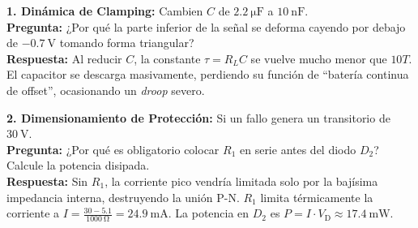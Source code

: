 \documentclass[11pt, a4paper]{article}
\begin{document}
\begin{aviso}
\textbf{1. Dinámica de Clamping:} Cambien $C$ de $\qty{2.2}{\micro\farad}$ a $\qty{10}{\nano\farad}$.\\
\textbf{Pregunta:} ¿Por qué la parte inferior de la señal se deforma cayendo por debajo de $\qty{-0.7}{\volt}$ tomando forma triangular? \\
\textbf{Respuesta:} Al reducir $C$, la constante $\tau = R_L C$ se vuelve mucho menor que $10T$. El capacitor se descarga masivamente, perdiendo su función de ``batería continua de offset'', ocasionando un \textit{droop} severo.

\vspace{0.2cm}
\textbf{2. Dimensionamiento de Protección:} Si un fallo genera un transitorio de $\qty{+30}{\volt}$.\\
\textbf{Pregunta:} ¿Por qué es obligatorio colocar $R_1$ en serie antes del diodo $D_2$? Calcule la potencia disipada. \\
\textbf{Respuesta:} Sin $R_1$, la corriente pico vendría limitada solo por la bajísima impedancia interna, destruyendo la unión P-N. $R_1$ limita térmicamente la corriente a $I = \frac{30 - 5.1}{\qty{1000}{\ohm}} = \qty{24.9}{\milli\ampere}$. La potencia en $D_2$ es $P = I \cdot V_{\text{D}} \approx \qty{17.4}{\milli\watt}$.
\end{aviso}
\end{document}

